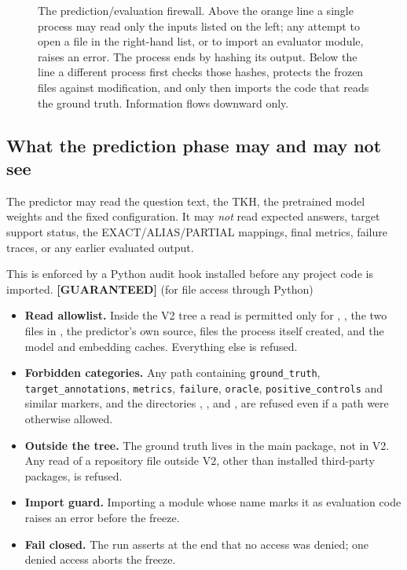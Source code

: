 \documentclass[11pt,a4paper]{article}
\theoremstyle{remark}
\newcommand{\code}[1]{\texttt{\small #1}}
\newcommand{\vtag}[2]{{\sffamily\scriptsize\bfseries\textcolor{#1}{[#2]}}}
\newcommand{\Gtag}{\vtag{accent}{GUARANTEED}}
\begin{document}
\begin{figure}[!htbp]
{}
\caption[Prediction/evaluation firewall and SHA-256 freeze]{The prediction/evaluation firewall. Above the orange line a single process may
read only the inputs listed on the left; any attempt to open a file in the right-hand
list, or to import an evaluator module, raises an error. The process ends by hashing its
output. Below the line a different process first checks those hashes, protects the frozen
files against modification, and only then imports the code that reads the ground truth.
Information flows downward only.}
\label{fig:firewall}
\end{figure}

\subsection{What the prediction phase may and may not see}

The predictor may read the question text, the TKH, the pretrained model weights and the
fixed configuration. It may \emph{not} read expected answers, target support status, the
EXACT/ALIAS/PARTIAL mappings, final metrics, failure traces, or any earlier evaluated
output.

This is enforced by a Python audit hook installed before any project code is imported.
\Gtag{} (for file access through Python)
\begin{itemize}
  \item \textbf{Read allowlist.} Inside the V2 tree a read is permitted only for
        , , the two files in , the
        predictor's own source, files the process itself created, and the model and
        embedding caches. Everything else is refused.
  \item \textbf{Forbidden categories.} Any path containing \code{ground\_truth},
        \code{target\_annotations}, \code{metrics}, \code{failure}, \code{oracle},
        \code{positive\_controls} and similar markers, and the directories ,
        ,  and , are refused even
        if a path were otherwise allowed.
  \item \textbf{Outside the tree.} The ground truth lives in the main package, not in V2.
        Any read of a repository file outside V2, other than installed third-party
        packages, is refused.
  \item \textbf{Import guard.} Importing a module whose name marks it as evaluation code
        raises an error before the freeze.
  \item \textbf{Fail closed.} The run asserts at the end that no access was denied; one
        denied access aborts the freeze.
\end{itemize}
\end{document}
